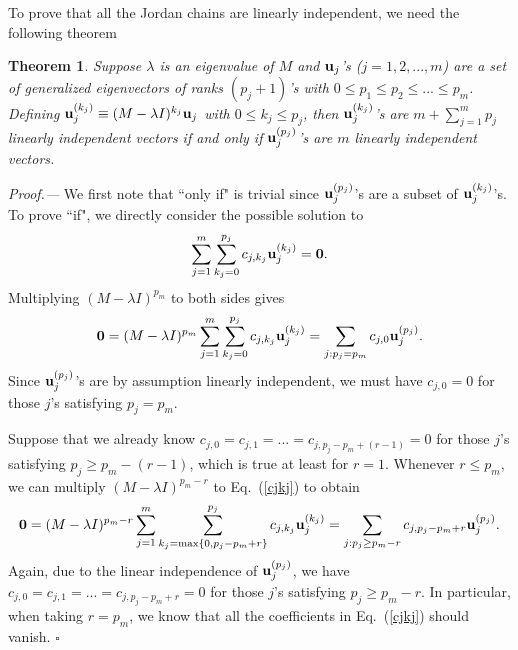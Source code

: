 \documentclass{tADP2e}
\theoremstyle{plain}
\theoremstyle{plain}
\newtheorem{theorem}{Theorem}[section]
\theoremstyle{definition}
\begin{document}
\begin{appendices}
To prove that all the Jordan chains are linearly independent, we need the following theorem
\begin{theorem}
Suppose $\lambda$ is an eigenvalue of $M$ and $\bold{u}_j$'s ($j=1,2,...,m$) are a set of generalized eigenvectors of ranks $(p_j+1)$'s with $0\le p_1\le p_2\le...\le p_m$. Defining $\bold{u}^{(k_j)}_j\equiv (M-\lambda I)^{k_j}\bold{u}_j$ with $0\le k_j \le p_j$, then $\bold{u}^{(k_j)}_j$'s are $m+\sum^m_{j=1}{p_j}$ linearly independent vectors if and only if $\bold{u}^{(p_j)}_j$'s are $m$ linearly independent vectors.
\label{lind}
\end{theorem}
\emph{Proof.---} We first note that ``only if" is trivial since $\bold{u}^{(p_j)}_j$'s are a subset of $\bold{u}^{(k_j)}_j$'s. To prove ``if", we directly consider the possible solution to
\begin{equation}
\sum^m_{j=1}\sum^{p_j}_{k_j=0} c_{j,k_j} \bold{u}^{(k_j)}_j = \bold{0}.
\label{cjkj}
\end{equation}
Multiplying $(M-\lambda I)^{p_m}$ to both sides gives
\begin{equation}
\bold{0}=(M-\lambda I)^{p_m}\sum^m_{j=1}\sum^{p_j}_{k_j=0} c_{j,k_j} \bold{u}^{(k_j)}_j = \sum_{j:p_j=p_m} c_{j,0} \bold{u}^{(p_j)}_j.
\end{equation}
Since $\bold{u}^{(p_j)}_j$'s are by assumption linearly independent, we must have $c_{j,0}=0$ for those $j$'s satisfying $p_j=p_m$. 

Suppose that we already know $c_{j,0}=c_{j,1}=...=c_{j,p_j-p_m+(r-1)}=0$ for those $j$'s satisfying $p_j\ge p_m-(r-1)$, which is true at least for $r=1$. Whenever $r\le p_m$, we can multiply $(M-\lambda I)^{p_m-r}$ to Eq.~(\ref{cjkj}) to obtain
\begin{equation}
\bold{0}=(M-\lambda I)^{p_m-r}\sum^m_{j=1}\sum^{p_j}_{k_j=\max\{0,p_j-p_m+r\}} c_{j,k_j} \bold{u}^{(k_j)}_j = \sum_{j:p_j\ge p_m-r} c_{j,p_j-p_m+r} \bold{u}^{(p_j)}_j.
\end{equation}
Again, due to the linear independence of $\bold{u}^{(p_j)}_j$, we have $c_{j,0}=c_{j,1}=...=c_{j,p_j-p_m+r}=0$ for those $j$'s satisfying $p_j\ge p_m-r$. In particular, when taking $r=p_m$, we know that all the coefficients in Eq.~(\ref{cjkj}) should vanish. $\square$ 


\end{appendices}
\end{document}
